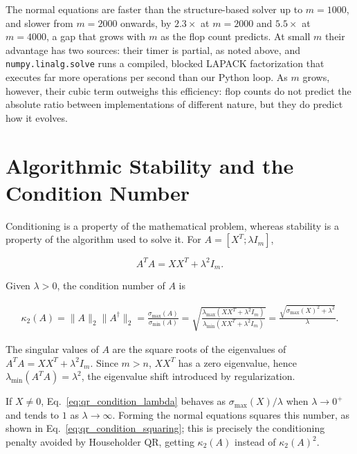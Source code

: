 \noindent The normal equations are faster than the structure-based solver up
to $m = 1000$, and slower from $m = 2000$ onwards, by $2.3\times$ at
$m = 2000$ and $5.5\times$ at $m = 4000$, a gap that grows with $m$ as the
flop count predicts. At small $m$ their advantage has two sources: their timer
is partial, as noted above, and \texttt{numpy.linalg.solve} runs a compiled,
blocked LAPACK factorization that executes far more operations per second than
our Python loop. As $m$ grows, however, their cubic term outweighs this
efficiency: flop counts do not predict the absolute ratio between
implementations of different nature, but they do predict how it evolves.

\section{Algorithmic Stability and the Condition Number}
\label{sec:qr_stability}

\noindent Conditioning is a property of the mathematical problem, whereas
stability is a property of the algorithm used to solve it. For
$A=[X^T;\lambda I_m]$,

\begin{equation}
    A^T A=XX^T+\lambda^2I_m.
\end{equation}

\noindent Given $\lambda>0$, the condition number of $A$ is

\begin{equation}
\label{eq:qr_condition_lambda}
\begin{aligned}
    \kappa_2(A)
    = \|A\|_2 \|A^\dagger\|_2
    = \frac{\sigma_{\max}(A)}{\sigma_{\min}(A)}
    = \sqrt{
        \frac{\lambda_{\max}(XX^T+\lambda^2I_m)}
             {\lambda_{\min}(XX^T+\lambda^2I_m)}
       }
    = \frac{\sqrt{\sigma_{\max}(X)^2+\lambda^2}}{\lambda}.
\end{aligned}
\end{equation}

\noindent The singular values of $A$ are the square roots of the
eigenvalues of $A^TA=XX^T+\lambda^2I_m$.
Since $m>n$, $XX^T$ has a zero eigenvalue, hence
$\lambda_{\min}(A^TA)=\lambda^2$, the eigenvalue shift introduced
by regularization.

\noindent If $X\neq0$, Eq.~\eqref{eq:qr_condition_lambda} behaves as
$\sigma_{\max}(X)/\lambda$ when $\lambda\to0^+$ and tends to $1$ as
$\lambda\to\infty$. Forming the normal equations squares this number, as
shown in Eq.~\eqref{eq:qr_condition_squaring}; this is precisely the
conditioning penalty avoided by Householder QR, getting $\kappa_2(A)$ instead of $\kappa_2(A)^2$.

